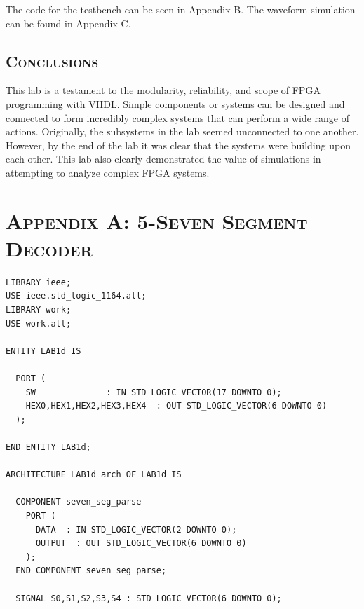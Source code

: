 \documentclass[11pt]{report}
\begin{document}
\begin{spacing}{1.5}
The code for the testbench can be seen in Appendix B.  The waveform simulation can be found in Appendix C.

\section{\scshape Conclusions} %
\label{sec:conclusions}

This lab is a testament to the modularity, reliability, and scope of FPGA programming with VHDL.  Simple components or systems can be designed and connected to form incredibly complex systems that can perform a wide range of actions.  Originally, the subsystems in the lab seemed unconnected to one another.  However, by the end of the lab it was clear that the systems were building upon each other.  This lab also clearly demonstrated the value of simulations in attempting to analyze complex FPGA systems.



\clearpage

{}

\clearpage

\chapter*{\scshape Appendix A: 5-Seven Segment Decoder}
\label{app:a}

\vspace{45px}
\begin{lstlisting}
LIBRARY ieee;
USE ieee.std_logic_1164.all;
LIBRARY work;
USE work.all;

ENTITY LAB1d IS

  PORT (
    SW              : IN STD_LOGIC_VECTOR(17 DOWNTO 0);
    HEX0,HEX1,HEX2,HEX3,HEX4  : OUT STD_LOGIC_VECTOR(6 DOWNTO 0)
  );
      
END ENTITY LAB1d;

ARCHITECTURE LAB1d_arch OF LAB1d IS

  COMPONENT seven_seg_parse
    PORT (
      DATA  : IN STD_LOGIC_VECTOR(2 DOWNTO 0);
      OUTPUT  : OUT STD_LOGIC_VECTOR(6 DOWNTO 0)
    );
  END COMPONENT seven_seg_parse;

  SIGNAL S0,S1,S2,S3,S4 : STD_LOGIC_VECTOR(6 DOWNTO 0);


\end{lstlisting}
\end{spacing}
\end{document}

